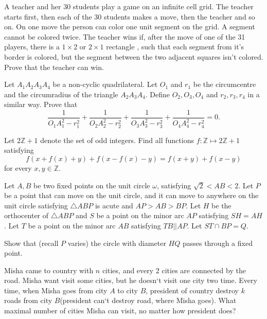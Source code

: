 \documentclass[11pt]{scrartcl}
\begin{document}
\begin{problem}[303061622555285]
A teacher and her 30 students play a game on an infinite cell grid. The teacher starts first, then each of the 30 students makes a move, then the teacher and so on. On one move the person can color one unit segment on the grid. A segment cannot be colored twice. The teacher wins if, after the move of one of the 31 players, there is a $1\times 2$ or $2\times 1$ rectangle , such that each segment from it's border is colored, but the segment between the two adjacent squares isn't colored. Prove that the teacher can win.
\end{problem}
\begin{problem}[307733682720311]
	Let $A_1A_2A_3A_4$ be a non-cyclic quadrilateral. Let $O_1$ and $r_1$ be the circumcentre and the circumradius of the triangle $A_2A_3A_4$. Define $O_2,O_3,O_4$ and $r_2,r_3,r_4$ in a similar way. Prove that
\[\frac{1}{O_1A_1^2-r_1^2}+\frac{1}{O_2A_2^2-r_2^2}+\frac{1}{O_3A_3^2-r_3^2}+\frac{1}{O_4A_4^2-r_4^2}=0.\]
\end{problem}
\begin{problem}[307861271235140]
Let $2\mathbb{Z} + 1$ denote the set of odd integers. Find all functions $f:\mathbb{Z} \mapsto 2\mathbb{Z} + 1$ satisfying\[ f(x + f(x) + y) + f(x - f(x) - y) = f(x+y) + f(x-y) \]for every $x, y \in \mathbb{Z}$.
\end{problem}
\begin{problem}[308110166188097]
Let $A,B$ be two fixed points on the unit circle $\omega$, satisfying $\sqrt{2} < AB < 2$. Let $P$ be a point that can move on the unit circle, and it can move to anywhere on the unit circle satisfying $\triangle ABP$ is acute and $AP>AB>BP$. Let $H$ be the orthocenter of $\triangle ABP$ and $S$ be a point on the minor arc $AP$ satisfying $SH=AH$. Let $T$ be a point on the minor arc $AB$ satisfying $TB || AP$. Let $ST\cap BP = Q$.

Show that (recall $P$ varies) the circle with diameter $HQ$ passes through a fixed point.
\end{problem}
\begin{problem}[308215997593136]
Misha came to country with $n$ cities, and every $2$ cities are connected by the road. Misha want visit some cities, but he doesn`t visit one city two time. Every time, when Misha goes from city $A$ to city $B$, president of country destroy $k$ roads from city $B$(president can`t destroy road, where Misha goes). What maximal number of cities Misha can visit, no matter how president does?
\end{problem}
\end{document}
